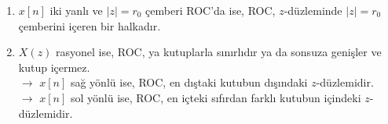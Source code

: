 \documentclass[11pt,a4paper]{article}
\begin{document}
\begin{enumerate}[label=\arabic*), start=4]
\begin{center}
\hspace{2cm}
    \end{center}
    \[
      X(z)=\sum_{n=-\infty}^{N_2}x[n]z^{-n}\ \
      \begin{array}{l}
        \longrightarrow N_2>0 \text{ iken } z\to0,\ X(z) \text{ sonsuza gider ve ROC, } z=0 \text{ içermez.}\\[1mm]
        \hookrightarrow x[n]=0,\ n>0 \text{ için } N_2\leq0 \text{ olur ve ROC, } z=0 \text{ içerir.}
      \end{array}
    \]
    $\rightarrow$ sol yanlı $x[n]$'nin ROC'u dışı bir çember ile sınırlanmış, orijine doğru genişleyen (orijini içerebilir) bir bölgedir.
  \sayfa{5}
  \item $x[n]$ iki yanlı ve $|z|=r_0$ çemberi ROC'da ise, ROC, $z$-düzleminde $|z|=r_0$ çemberini içeren bir halkadır.
    \begin{center}
    \end{center}
  \item $X(z)$ rasyonel ise, ROC, ya kutuplarla sınırlıdır ya da sonsuza genişler ve kutup içermez.\\
    $\rightarrow$ $x[n]$ sağ yönlü ise, ROC, en dıştaki kutubun dışındaki $z$-düzlemidir.\\
    $\rightarrow$ $x[n]$ sol yönlü ise, ROC, en içteki sıfırdan farklı kutubun içindeki $z$-düzlemidir.
\end{enumerate}
\end{document}
